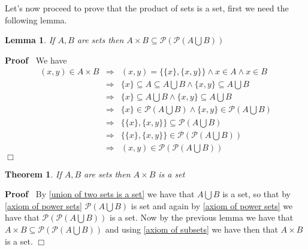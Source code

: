 \documentclass{book}
\newenvironment{proof}{\noindent\textbf{Proof\ }}{\hspace*{\fill}$\Box$\medskip}
\newtheorem{lemma}{Lemma}
\newtheorem{theorem}{Theorem}
\begin{document}
{{Let's now proceed to prove that the product of sets is a set, first we need
the following lemma.

\begin{lemma}
  \label{product of sets as element}If $A, B$ are sets then $A \times B
  \subseteq \mathcal{P} \left( \mathcal{P} \left( A \bigcup B \right) \right)$
\end{lemma}

\begin{proof}
  We have
  \begin{eqnarray*}
    (x, y) \in A \times B & \Rightarrow & (x, y) = \{ \{ x \}, \{ x, y \} \}
    \wedge x \in A \wedge x \in B\\
    & \Rightarrow & \{ x \} \subseteq A \subseteq A \bigcup B \wedge \{ x, y
    \} \subseteq A \bigcup B\\
    & \Rightarrow & \{ x \} \subseteq A \bigcup B \wedge \{ x, y \} \subseteq
    A \bigcup B\\
    & \Rightarrow & \{ x \} \in \mathcal{P} \left( A \bigcup B \right) \wedge
    \{ x, y \} \in \mathcal{P} \left( A \bigcup B \right)\\
    & \Rightarrow & \{ \{ x \}, \{ x, y \} \} \subseteq \mathcal{P} \left( A
    \bigcup B \right)\\
    & \Rightarrow & \{ \{ x \}, \{ x, y \} \} \in \mathcal{P} \left(
    \mathcal{P} \left( A \bigcup B \right) \right)\\
    & \Rightarrow & (x, y) \in \mathcal{P} \left( \mathcal{P} \left( A
    \bigcup B \right) \right)
  \end{eqnarray*}
\end{proof}

\begin{theorem}
  \label{product of sets is a set}If $A, B$ are sets then $A \times B$ is a
  set
\end{theorem}

\begin{proof}
  By \ref{union of two sets is a set} we have that $A \bigcup B$ is a set, so
  that by \ref{axiom of power sets} $\mathcal{P} \left( A \bigcup B \right)$
  is set and again by \ref{axiom of power sets} we have that $\mathcal{P}
  \left( \mathcal{P} \left( A \bigcup B \right) \right)$ is a set. Now by the
  previous lemma we have that $A \times B \subseteq \mathcal{P} \left(
  \mathcal{P} \left( A \bigcup B \right) \right)$ and using \ref{axiom of
  subsets} we have then that $A \times B$ is a set.
\end{proof}

}}
\end{document}
